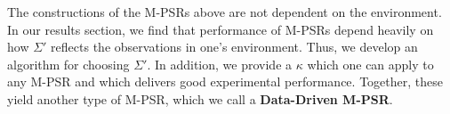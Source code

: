 The constructions of the M-PSRs above are not dependent on the environment. In our results section, we find that performance of M-PSRs depend heavily on how $\Sigma'$ reflects the observations in one's environment. Thus, we develop an algorithm for choosing $\Sigma'$. In addition, we provide a $\kappa$ which one can apply to any M-PSR and which delivers good experimental performance. Together, these yield another type of M-PSR, which we call a \textbf{Data-Driven M-PSR}.
